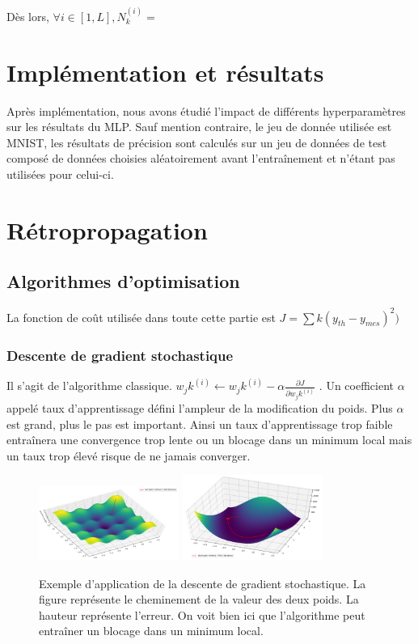 Dès lors, $\forall i \in [1,L], N^{(i)}_k =  $



\section{Implémentation et résultats}
Après implémentation, nous avons étudié l'impact de différents hyperparamètres sur les résultats du MLP. Sauf mention contraire, le jeu de donnée utilisée est MNIST, les résultats de précision sont calculés sur un jeu de données de test composé de données choisies aléatoirement avant l’entraînement et n'étant pas utilisées pour celui-ci.

\section{Rétropropagation}


\subsection{Algorithmes d'optimisation}
La fonction de coût utilisée dans toute cette partie est $J = \sum \limits{k}{} (y_{th} - y_{mes})^2)$


\subsubsection{Descente de gradient stochastique}
Il s'agit de l'algorithme classique.  $w_jk^{(i)} \leftarrow w_jk^{(i)} - \alpha \frac{\partial J}{\partial w_jk^{(i)}}$ . Un coefficient $\alpha$ appelé taux d'apprentissage défini l'ampleur de la modification du poids. Plus $\alpha$ est grand, plus le pas est important. Ainsi un taux d'apprentissage trop faible entraînera une convergence trop lente ou un blocage dans un minimum local mais un taux trop élevé risque de ne jamais converger. 

\begin{figure}[!h]
\centering
\includegraphics[width=130pt]{"images/MLP/descentedegradientstochastique"}
\hspace*{10mm}
\includegraphics[width=130pt]{"images/MLP/descentedegradientstochastiquepropre"}
\caption{Exemple d'application de la descente de gradient stochastique. La figure représente le cheminement de la valeur des deux poids. La hauteur représente l'erreur. On voit bien ici que l'algorithme peut entraîner un blocage dans un minimum local.}
\label{descentedegradientstochastique}
\end{figure}



